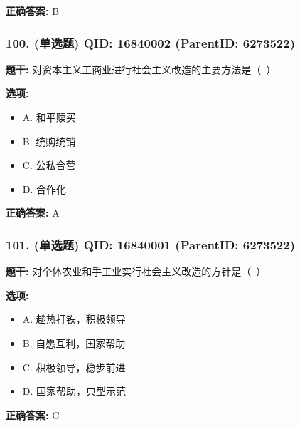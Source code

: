 \documentclass[12pt,UTF8]{ctexart}
\begin{document}
\textbf{正确答案:}
B

\vspace{0.3em}\hrulefill\vspace{0.7em}

\subsubsection*{100. (单选题) \small QID: 16840002 (ParentID: 6273522)}

\textbf{题干:}
对资本主义工商业进行社会主义改造的主要方法是（ ）



\textbf{选项:}
\begin{itemize}[leftmargin=*]

  \item A. 和平赎买

  \item B. 统购统销

  \item C. 公私合营

  \item D. 合作化

\end{itemize}

\textbf{正确答案:}
A

\vspace{0.3em}\hrulefill\vspace{0.7em}

\subsubsection*{101. (单选题) \small QID: 16840001 (ParentID: 6273522)}

\textbf{题干:}
对个体农业和手工业实行社会主义改造的方针是（ ）



\textbf{选项:}
\begin{itemize}[leftmargin=*]

  \item A. 趁热打铁，积极领导

  \item B. 自愿互利，国家帮助

  \item C. 积极领导，稳步前进

  \item D. 国家帮助，典型示范

\end{itemize}

\textbf{正确答案:}
C
\end{document}
